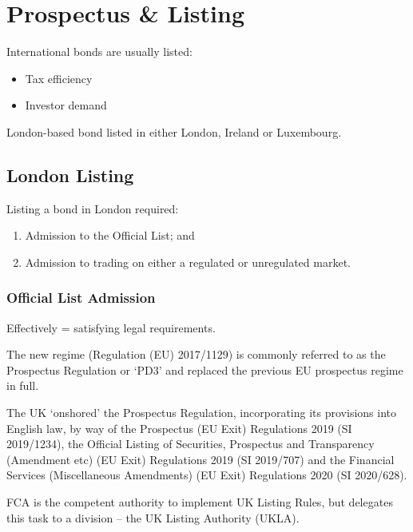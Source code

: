 \documentclass[
]{article}
\providecommand{\tightlist}{%
  \setlength{\itemsep}{0pt}\setlength{\parskip}{0pt}}
\begin{document}
\hypertarget{prospectus-listing}{%
\section{Prospectus \& Listing}\label{prospectus-listing}}

International bonds are usually listed:

\begin{itemize}
\tightlist
\item
  Tax efficiency
\item
  Investor demand
\end{itemize}

London-based bond listed in either London, Ireland or Luxembourg.

\hypertarget{london-listing}{%
\subsection{London Listing}\label{london-listing}}

Listing a bond in London required:

\begin{enumerate}
\tightlist
\item
  Admission to the Official List; and
\item
  Admission to trading on either a regulated or unregulated market.
\end{enumerate}

\hypertarget{official-list-admission}{%
\subsubsection{Official List Admission}\label{official-list-admission}}

Effectively = satisfying legal requirements.

The new regime (Regulation (EU) 2017/1129) is commonly referred to as
the Prospectus Regulation or `PD3' and replaced the previous EU
prospectus regime in full.

The UK `onshored' the Prospectus Regulation, incorporating its
provisions into English law, by way of the Prospectus (EU Exit)
Regulations 2019 (SI 2019/1234), the Official Listing of Securities,
Prospectus and Transparency (Amendment etc) (EU Exit) Regulations 2019
(SI 2019/707) and the Financial Services (Miscellaneous Amendments) (EU
Exit) Regulations 2020 (SI 2020/628).

FCA is the competent authority to implement UK Listing Rules, but
delegates this task to a division -- the UK Listing Authority (UKLA).
\end{document}
